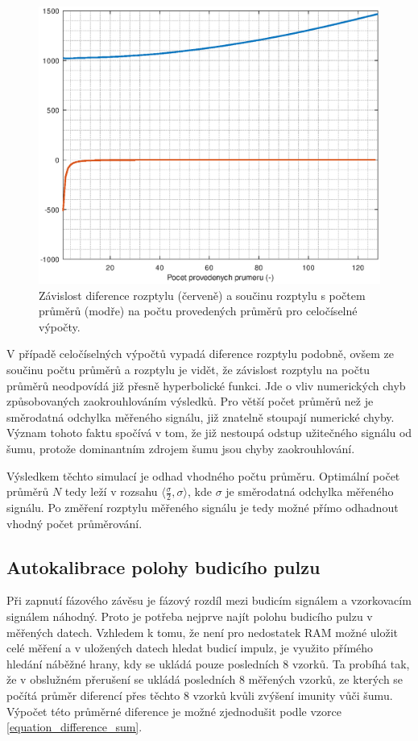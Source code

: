 \begin{figure}[htbp]
\includegraphics[width=\textwidth,keepaspectratio]{images/averaging_integer_difference_error.eps}\caption{Závislost diference rozptylu (červeně) a součinu rozptylu s počtem průměrů (modře) na počtu provedených průměrů pro celočíselné výpočty.}\label{averaging_integer_difference_error}
\end{figure}

V případě celočíselných výpočtů vypadá diference rozptylu podobně, ovšem ze součinu počtu průměrů a rozptylu je vidět, že závislost rozptylu na počtu průměrů neodpovídá již přesně hyperbolické funkci. Jde o vliv numerických chyb způsobovaných zaokrouhlováním výsledků. Pro větší počet průměrů než je směrodatná odchylka měřeného signálu, již znatelně stoupají numerické chyby. Význam tohoto faktu spočívá v tom, že již nestoupá odstup užitečného signálu od šumu, protože dominantním zdrojem šumu jsou chyby zaokrouhlování.

Výsledkem těchto simulací je odhad vhodného počtu průměru. Optimální počet průměrů $N$ tedy leží v rozsahu $\langle\frac{\sigma}{2}, \sigma \rangle$, kde $\sigma$ je směrodatná odchylka měřeného signálu. Po změření rozptylu měřeného signálu je tedy možné přímo odhadnout vhodný počet průměrování.

\subsection{Autokalibrace polohy budicího pulzu}
Při zapnutí fázového závěsu je fázový rozdíl mezi budicím signálem a vzorkovacím signálem náhodný. Proto je potřeba nejprve najít polohu budicího pulzu v měřených datech. Vzhledem k tomu, že není pro nedostatek RAM možné uložit celé měření a v uložených datech hledat budicí impulz, je využito přímého hledání náběžné hrany, kdy se ukládá pouze posledních 8 vzorků. Ta probíhá tak, že v obslužném přerušení se ukládá posledních 8 měřených vzorků, ze kterých se počítá průměr diferencí přes těchto 8 vzorků kvůli zvýšení imunity vůči šumu. Výpočet této průměrné diference je možné zjednodušit podle vzorce \ref{equation_difference_sum}. 

